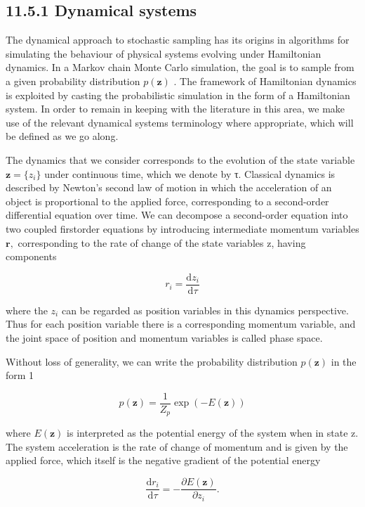 \documentclass[
  10
]{article}
\begin{document}
\subsection{11.5.1 Dynamical systems}\label{dynamical-systems}

The dynamical approach to stochastic sampling has its origins in
algorithms for simulating the behaviour of physical systems evolving
under Hamiltonian dynamics. In a Markov chain Monte Carlo simulation,
the goal is to sample from a given probability distribution
\(p ( \mathbf { z } )\) . The framework of Hamiltonian dynamics is
exploited by casting the probabilistic simulation in the form of a
Hamiltonian system. In order to remain in keeping with the literature in
this area, we make use of the relevant dynamical systems terminology
where appropriate, which will be defined as we go along.

The dynamics that we consider corresponds to the evolution of the state
variable \(\mathbf { z } = \{ z _ { i } \}\) under continuous time,
which we denote by τ. Classical dynamics is described by Newton's second
law of motion in which the acceleration of an object is proportional to
the applied force, corresponding to a second-order differential equation
over time. We can decompose a second-order equation into two coupled
firstorder equations by introducing intermediate momentum variables
\(\mathbf { r } ,\) corresponding to the rate of change of the state
variables z, having components

\[
r _ {i} = \frac {\mathrm{d} z _ {i}}{\mathrm{d} \tau}\tag{11.53}
\]

where the \(z _ { i }\) can be regarded as position variables in this
dynamics perspective. Thus for each position variable there is a
corresponding momentum variable, and the joint space of position and
momentum variables is called phase space.

Without loss of generality, we can write the probability distribution
\(p ( \mathbf { z } )\) in the form 1

\[
p (\mathbf {z}) = \frac {1}{Z _ {p}} \exp (- E (\mathbf {z}))\tag{11.54}
\]

where \(E ( \mathbf { z } )\) is interpreted as the potential energy of
the system when in state z. The system acceleration is the rate of
change of momentum and is given by the applied force, which itself is
the negative gradient of the potential energy

\[
\frac {\mathrm{d} r _ {i}}{\mathrm{d} \tau} = - \frac {\partial E (\mathbf {z})}{\partial z _ {i}}.\tag{11.55}
\]
\end{document}
